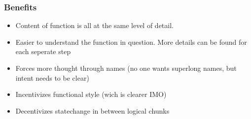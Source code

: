 \begin{frame}
    \frametitle{Benefits}
    \begin{block}
        \begin{itemize}
            \item Content of function is all at the same level of detail.
            \item Easier to understand the function in question. More details can be found for each seperate step
            \item Forces more thought through names (no one wants superlong names, but intent needs to be clear)
            \item Incentivizes functional style (wich is clearer IMO)
            \item Decentivizes statechange in between logical chunks
        \end{itemize}
    \end{block}
\end{frame}
